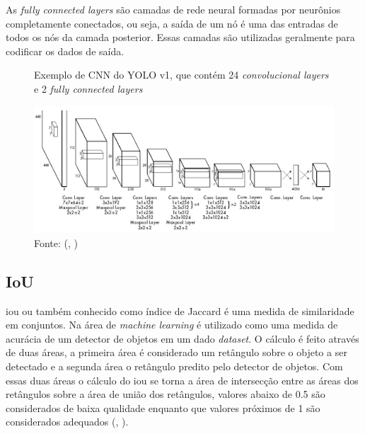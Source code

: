 \documentclass[]{politex}
\begin{document}
As \textit{fully connected layers} são camadas de rede neural formadas por neurônios completamente conectados, ou seja, a saída de um nó é uma das entradas de todos os nós da camada posterior. Essas camadas são utilizadas geralmente para codificar os dados de saída.

\begin{figure}[H]
    \centering
    \caption{Exemplo de CNN do YOLO v1, que contém 24 \textit{convolucional layers} e 2 \textit{fully connected layers}}
    \includegraphics[width=\textwidth]{arquitetura_yolo}
    \caption*{Fonte: (, \citeyear{yolov1})}
    \label{fig:arq_yolo}
\end{figure}

\subsection{IoU}
\acrfull{iou} ou também conhecido como índice de Jaccard é uma medida de similaridade em conjuntos. Na área de \textit{machine learning} é utilizado como uma medida de acurácia de um detector de objetos em um dado \textit{dataset}. O cálculo é feito através de duas áreas, a primeira área é considerado um retângulo sobre o objeto a ser detectado e a segunda área o retângulo predito pelo detector de objetos. Com essas duas áreas o cálculo do \acrshort{iou} se torna a área de intersecção entre as áreas dos retângulos sobre a área de união dos retângulos, valores abaixo de 0.5 são considerados de baixa qualidade enquanto que valores próximos de 1 são considerados adequados (, \citeyear{iou}).
\end{document}

